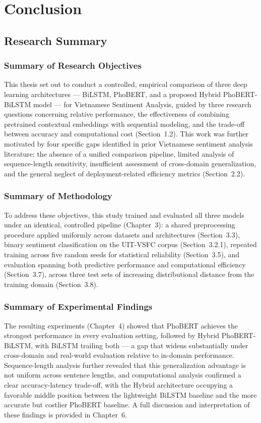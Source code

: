 \documentclass[12pt]{report} %
\begin{document}
\chapter{Conclusion}

\section{Research Summary}

\subsection{Summary of Research Objectives}
This thesis set out to conduct a controlled, empirical comparison of three deep learning architectures --- BiLSTM, PhoBERT, and a proposed Hybrid PhoBERT-BiLSTM model --- for Vietnamese Sentiment Analysis, guided by three research questions concerning relative performance, the effectiveness of combining pretrained contextual embeddings with sequential modeling, and the trade-off between accuracy and computational cost (Section~1.2). This work was further motivated by four specific gaps identified in prior Vietnamese sentiment analysis literature: the absence of a unified comparison pipeline, limited analysis of sequence-length sensitivity, insufficient assessment of cross-domain generalization, and the general neglect of deployment-related efficiency metrics (Section~2.2).

\subsection{Summary of Methodology}
To address these objectives, this study trained and evaluated all three models under an identical, controlled pipeline (Chapter~3): a shared preprocessing procedure applied uniformly across datasets and architectures (Section~3.3), binary sentiment classification on the UIT-VSFC corpus (Section~3.2.1), repeated training across five random seeds for statistical reliability (Section~3.5), and evaluation spanning both predictive performance and computational efficiency (Section~3.7), across three test sets of increasing distributional distance from the training domain (Section~3.8).

\subsection{Summary of Experimental Findings}
The resulting experiments (Chapter~4) showed that PhoBERT achieves the strongest performance in every evaluation setting, followed by Hybrid PhoBERT-BiLSTM, with BiLSTM trailing both --- a gap that widens substantially under cross-domain and real-world evaluation relative to in-domain performance. Sequence-length analysis further revealed that this generalization advantage is not uniform across sentence lengths, and computational analysis confirmed a clear accuracy-latency trade-off, with the Hybrid architecture occupying a favorable middle position between the lightweight BiLSTM baseline and the more accurate but costlier PhoBERT baseline. A full discussion and interpretation of these findings is provided in Chapter~6.
\end{document}
